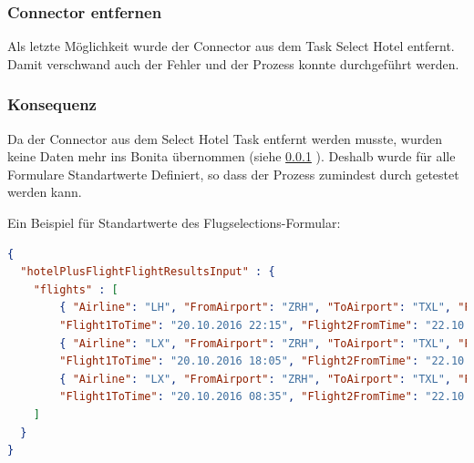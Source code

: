 \subsubsection{Connector entfernen}
\label{sec:umsetzung:problem:removeconnector}
Als letzte Möglichkeit wurde der Connector aus dem Task Select Hotel entfernt. Damit verschwand auch der Fehler und der Prozess konnte durchgeführt werden.

\subsubsection{Konsequenz}
Da der Connector aus dem Select Hotel Task entfernt werden musste, wurden keine Daten mehr ins Bonita übernommen (siehe \cref{sec:umsetzung:problem:removeconnector} ). Deshalb wurde für alle Formulare Standartwerte Definiert, so dass der Prozess zumindest durch getestet werden kann.

Ein Beispiel für Standartwerte des Flugselections-Formular:
\begin{lstlisting}[language=json,firstnumber=1]
{
  "hotelPlusFlightFlightResultsInput" : {
    "flights" : [
        { "Airline": "LH", "FromAirport": "ZRH", "ToAirport": "TXL", "Flight1FromTime": "20.10.2016 20:15", 
        "Flight1ToTime": "20.10.2016 22:15", "Flight2FromTime": "22.10.2016 12:25", "Flight2ToTime": "22.10.2016 14:35"},
        { "Airline": "LX", "FromAirport": "ZRH", "ToAirport": "TXL", "Flight1FromTime": "20.10.2016 16:00", 
        "Flight1ToTime": "20.10.2016 18:05", "Flight2FromTime": "22.10.2016 20:45", "Flight2ToTime": "22.10.2016 22:40"},
        { "Airline": "LX", "FromAirport": "ZRH", "ToAirport": "TXL", "Flight1FromTime": "20.10.2016 06:30", 
        "Flight1ToTime": "20.10.2016 08:35", "Flight2FromTime": "22.10.2016 16:00", "Flight2ToTime": "22.10.2016 18:00"}
    ]
  }
}
\end{lstlisting}
